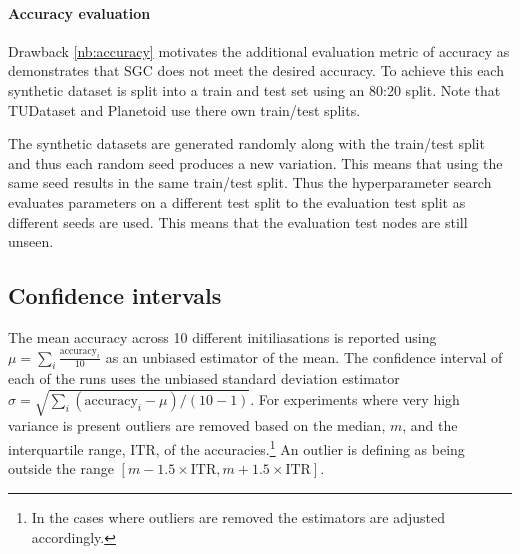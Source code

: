 
\paragraph{Accuracy evaluation}
Drawback \ref{nb:accuracy} motivates the additional evaluation metric of accuracy as  demonstrates that SGC does not meet the desired accuracy.
To achieve this each synthetic dataset is split into a train and test set using an 80:20 split.
Note that TUDataset\cite{Morris+2020} and Planetoid\cite{kipf2016semi} use there own train/test splits.

The synthetic datasets are generated randomly along with the train/test split and thus each random seed produces a new variation.
This means that using the same seed results in the same train/test split.
Thus the hyperparameter search evaluates parameters on a different test split to the evaluation test split as different seeds are used.
This means that the evaluation test nodes are still unseen.

\subsection{Confidence intervals}
\label{sec:reporting}
The mean accuracy across 10 different initiliasations is reported using $\mu = \sum_i\frac{\text{accuracy}_i}{10}$ as an unbiased estimator of the mean.
The confidence interval of each of the runs uses the unbiased standard deviation estimator $\sigma = \sqrt{\sum_i(\text{accuracy}_i - \mu)/(10 - 1)}$.
For experiments where very high variance is present outliers are removed based on the median, $m$, and the interquartile range, $\text{ITR}$, of the accuracies.\footnote{In the cases where outliers are removed the estimators are adjusted accordingly.}
An outlier is defining as being outside the range $[m - 1.5 \times \text{ITR}, m + 1.5 \times \text{ITR}]$.


